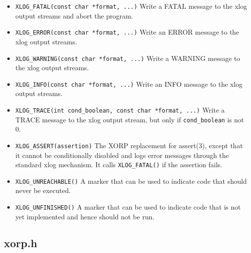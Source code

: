 \documentclass[11pt]{article}
\begin{document}
\begin{itemize}

  \item \verb=XLOG_FATAL(const char *format, ...)=
  \newline
  Write a FATAL message to the xlog output streams and abort the program.

  \item \verb=XLOG_ERROR(const char *format, ...)=
  \newline
  Write an ERROR message to the xlog output streams.

  \item \verb=XLOG_WARNING(const char *format, ...)=
  \newline
  Write a WARNING message to the xlog output streams.

  \item \verb=XLOG_INFO(const char *format, ...)=
  \newline
  Write an INFO message to the xlog output streams.

  \item \verb=XLOG_TRACE(int cond_boolean, const char *format, ...)=
  \newline
  Write a TRACE message to the xlog output stream, but only
  if \verb=cond_boolean= is not 0.

  \item \verb=XLOG_ASSERT(assertion)=
  \newline
  The XORP replacement for assert(3), except that it cannot be
  conditionally disabled and logs error messages through the standard
  xlog mechanism. It calls \verb=XLOG_FATAL()= if the assertion fails.

  \item \verb=XLOG_UNREACHABLE()=
  \newline
   A marker that can be used to indicate code that should never be executed.

  \item \verb=XLOG_UNFINISHED()=
  \newline
  A marker that can be used to indicate code that is not yet implemented
  and hence should not be run.

\end{itemize}

\subsection{xorp.h}
\end{document}
